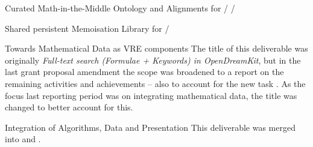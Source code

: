 \begin{workpackage}[id=dksbases,%
  title=Data/Knowledge/Software-Bases,lead=FAU,
  ZHRM=12,JURM=12,FAURM=34,UWRM=25,SARM=10,LLRM=2,PSRM=25]
\begin{wpdelivs}
  \begin{wpdeliv}[due=36,id=lfmverif,dissem=PU,nature=OTHER,lead=FAU,issue=142,miles=dksbases-interop1,status=delivered]
    {Curated Math-in-the-Middle Ontology and Alignments for \GAP / \Sage / \LMFDB}
  \end{wpdeliv}
\begin{wpdeliv}[due=42,miles=dksbases-interop2,id=persistent-memoization,dissem=PU,nature=OTHER,lead=SA,issue=143]
    {Shared persistent Memoisation Library for \Python/\Sage}
  \end{wpdeliv}
  \begin{wpdeliv}[id=nbad-search,due=48,nature=OTHER,dissem=PU,lead=FAU,issue=134,miles=dksbases-interop2]
    {Towards Mathematical Data as VRE components}
    The title of this deliverable was originally \emph{Full-text search (Formulae +
      Keywords) in OpenDreamKit}, but in the last grant proposal amendment the scope was
    broadened to a report on the remaining  activities and
    achievements -- also to account for the new task . As the focus
    last reporting period was on integrating mathematical data, the title was changed to
    better account for this. 
  \end{wpdeliv}
  \begin{wpdeliv}[due=48,%
                  id=lfmint,dissem=PU,nature=R,lead=FAU,issue=135,status=canceled]
    {\LMFDB Integration of Algorithms, Data and Presentation}
    This deliverable was merged into  and .
  \end{wpdeliv}
\end{wpdelivs}
  
\begin{comment}
Another connection: on several occasions, we found that software was the best way to
represent certain databases of mathematical knowledge. E.g. in Algebraic Combinatorics we
have a whole zoo of Hopf algebras. Many of them are implemented in MuPAD/Sage by
specifying the objects that index the basis together with computation rules for the
product and coproduct. When we want to retrieve information about such algebras, it's
usually much more convenient to look at the code than to search through the
literature. Especially since the code is usually more correct than the literature because
it's *tested*.


\end{comment}
\end{workpackage}
